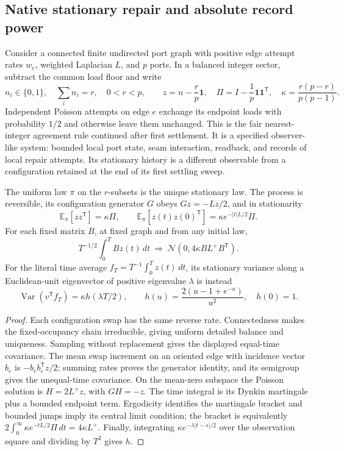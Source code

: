 \subsection{Native stationary repair and absolute record power}
\label{subsec:native-repair-record-spectrum}

Consider a connected finite undirected port graph with positive edge attempt
rates \(w_e\), weighted Laplacian \(L\), and \(p\) ports. In a balanced
integer sector, subtract the common load floor and write
\[
 n_i\in\{0,1\},\quad \sum_i n_i=r,\quad 0<r<p,\qquad
 z=n-\frac rp\mathbf1,\quad
 \Pi=I-\frac1p\mathbf1\mathbf1^{\mathsf T},\quad
 \kappa=\frac{r(p-r)}{p(p-1)}.
\]
Independent Poisson attempts on edge \(e\) exchange its endpoint loads with
probability \(1/2\) and otherwise leave them unchanged. This is the fair
nearest-integer agreement rule continued after first settlement. It is a
specified observer-like system: bounded local port state, seam interaction,
readback, and records of local repair attempts. Its stationary history is a
different observable from a configuration retained at the end of its first
settling sweep.

\begin{theorem}
\label{thm:native-stationary-history}
The uniform law \(\pi\) on the \(r\)-subsets is the unique stationary law.
The process is reversible, its configuration generator \(G\) obeys
\(Gz=-Lz/2\), and in stationarity
\[
 \mathbb E_\pi[zz^{\mathsf T}]=\kappa\Pi,\qquad
 \mathbb E_\pi[z(t)z(0)^{\mathsf T}]
   =\kappa e^{-|t|L/2}\Pi.
\]
For each fixed matrix \(B\), at fixed graph and from any initial law,
\[
 T^{-1/2}\int_0^T Bz(t)\,dt
 \ \Longrightarrow\ \mathcal N(0,4\kappa B L^+B^{\mathsf T}).
\]
For the literal time average \(f_T=T^{-1}\int_0^Tz(t)\,dt\), its
stationary variance along a Euclidean-unit eigenvector of positive
eigenvalue \(\lambda\) is instead
\[
 \operatorname{Var}(v^{\mathsf T}f_T)=\kappa h(\lambda T/2),\qquad
 h(u)=\frac{2(u-1+e^{-u})}{u^2},\quad h(0)=1.
\]
\end{theorem}
\begin{proof}
Each configuration swap has the same reverse rate. Connectedness makes the
fixed-occupancy chain irreducible, giving uniform detailed balance and
uniqueness. Sampling without replacement gives the displayed equal-time
covariance. The mean swap increment on an oriented edge with incidence
vector \(b_e\) is \(-b_eb_e^{\mathsf T}z/2\); summing rates proves the
generator identity, and its semigroup gives the unequal-time covariance.
On the mean-zero subspace the Poisson solution is \(H=2L^+z\), with
\(GH=-z\). The time integral is its Dynkin martingale plus a bounded
endpoint term. Ergodicity identifies the martingale bracket and bounded
jumps imply its central limit condition; the bracket is equivalently
\(2\int_0^\infty\kappa e^{-tL/2}\Pi\,dt=4\kappa L^+\).
Finally, integrating \(\kappa e^{-\lambda|t-s|/2}\) over the observation
square and dividing by \(T^2\) gives \(h\).
\end{proof}

